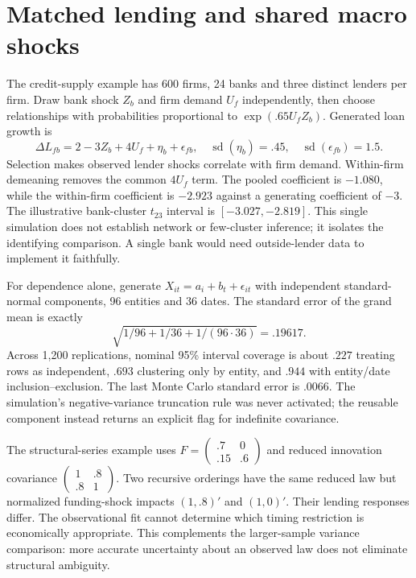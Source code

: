 \section{Matched lending and shared macro shocks}
\label{r3:credit-dependence-study}

The credit-supply example has 600 firms, 24 banks and three distinct
lenders per firm. Draw bank shock $Z_b$ and firm demand $U_f$
independently, then choose relationships with probabilities proportional
to $\exp(.65U_fZ_b)$. Generated loan growth is
\[
 \Delta L_{fb}=2-3Z_b+4U_f+\eta_b+\epsilon_{fb},
 \quad \operatorname{sd}(\eta_b)=.45,\quad
 \operatorname{sd}(\epsilon_{fb})=1.5.
\]
Selection makes observed lender shocks correlate with firm demand.
Within-firm demeaning removes the common $4U_f$ term. The pooled
coefficient is $-1.080$, while the within-firm coefficient is $-2.923$
against a generating coefficient of $-3$. The illustrative bank-cluster
$t_{23}$ interval is $[-3.027,-2.819]$. This single simulation does
not establish network or few-cluster inference; it isolates the
identifying comparison. A single bank would need outside-lender data
to implement it faithfully.

For dependence alone, generate
$X_{it}=a_i+b_t+\epsilon_{it}$ with independent standard-normal
components, 96 entities and 36 dates. The standard error of the
grand mean is exactly
\[
 \sqrt{1/96+1/36+1/(96\cdot36)}=.19617.
\]
Across 1,200 replications, nominal 95\% interval coverage is about
$.227$ treating rows as independent, $.693$ clustering only by entity,
and $.944$ with entity/date inclusion--exclusion. The last Monte Carlo
standard error is $.0066$. The simulation's negative-variance
truncation rule was never activated; the reusable component instead
returns an explicit flag for indefinite covariance.

The structural-series example uses
$F=\left(\begin{smallmatrix}.7&0\\.15&.6\end{smallmatrix}\right)$
and reduced innovation covariance
$\left(\begin{smallmatrix}1&.8\\.8&1\end{smallmatrix}\right)$.
Two recursive orderings have the same reduced law but normalized
funding-shock impacts $(1,.8)'$ and $(1,0)'$. Their lending responses
differ. The observational fit cannot determine which timing restriction
is economically appropriate. This complements the larger-sample
variance comparison: more accurate uncertainty about an observed law
does not eliminate structural ambiguity.

